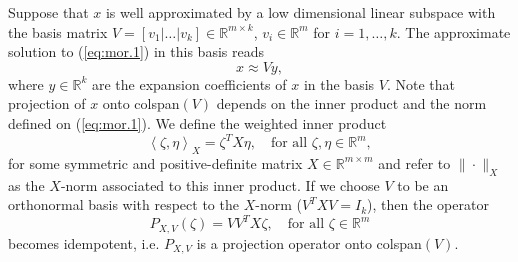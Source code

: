 Suppose that $x$ is well approximated by a low dimensional linear subspace with the basis matrix $V=[v_1|\dots|v_k]\in \mathbb R^{m\times k}$, $v_i\in \mathbb R^{m}$ for $i=1,\dots,k$. The approximate solution to (\ref{eq:mor.1}) in this basis reads
\begin{equation} \label{eq:mor.2}
	x \approx Vy,
\end{equation}
where $y \in \mathbb R^k$ are the expansion coefficients of $x$ in the basis $V$. Note that projection of $x$ onto colspan$(V)$ depends on the inner product and the norm defined on (\ref{eq:mor.1}). We define the weighted inner product
\begin{equation} \label{eq:mor.3}
	\left\langle \zeta,\eta \right\rangle_X = \zeta^TX \eta,\quad \text{for all } \zeta,\eta \in \mathbb R^m,
\end{equation}
for some symmetric and positive-definite matrix $X\in \mathbb{R}^{m\times m}$ and refer to $\|\cdot \|_X$ as the $X$-norm associated to this inner product. If we choose $V$ to be an orthonormal basis with respect to the $X$-norm ($V^TXV=I_k$), then the operator
\begin{equation} \label{eq:mor.4}
	P_{X,V}(\zeta) = VV^TX\zeta, \quad \text{for all } \zeta \in \mathbb R^{m}
\end{equation}
becomes idempotent, i.e. $P_{X,V}$ is a projection operator onto colspan$(V)$.

